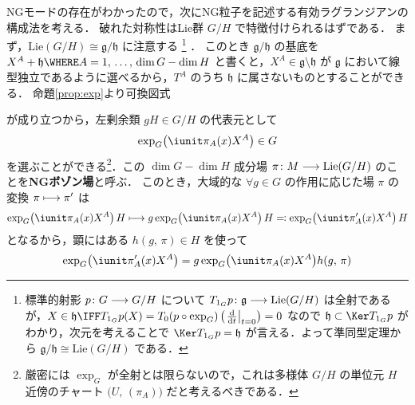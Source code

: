 \documentclass[TQFT_main]{subfiles}
\begin{document}
NGモードの存在がわかったので，次にNG粒子を記述する有効ラグランジアンの構成法を考える．
破れた対称性はLie群 $G/H$ で特徴付けられるはずである．
まず，$\mathrm{Lie}(G/H) \cong \mathfrak{g}/\mathfrak{h}$ に注意する
\footnote{標準的射影 $p \colon G \longrightarrow G/H$ について $T_{1_G} p \colon \mathfrak{g} \longrightarrow \mathrm{Lie}(G/H)$  は全射であるが，$X \in \mathfrak{h} \IFF T_{1_G}p (X) = T_{0}(p \circ \exp_G) \left( \eval{\dv{}{t}}_{t=0} \right)=0$ なので $\mathfrak{h} \subset \Ker T_{1_G} p$ がわかり，次元を考えることで $\Ker T_{1_G} p = \mathfrak{h}$ が言える．よって準同型定理から $\mathfrak{g}/\mathfrak{h} \cong \mathrm{Lie}(G/H)$ である．}
．
このとき $\mathfrak{g}/\mathfrak{h}$ の基底を $X^A + \mathfrak{h}\WHERE A=1,\, \dots,\, \dim G - \dim H$ と書くと，$X^A \in \mathfrak{g} \setminus \mathfrak{h}$ が $\mathfrak{g}$ において線型独立であるように選べるから，$T^A$ のうち $\mathfrak{h}$ に属さないものとすることができる．
命題\ref{prop:exp}より可換図式
\begin{center}
\end{center}
が成り立つから，左剰余類 $gH \in G/H$ の代表元として
\begin{align}
    \label{eq:coordinate-coset1}
    \exp_G\bigl(\iunit \pi_A(x)X^A\bigr) \in G
\end{align}
を選ぶことができる\footnote{厳密には $\exp_G$ が全射とは限らないので，これは多様体 $G/H$ の単位元 $H$ 近傍のチャート $\bigl(U,\, (\pi_A)\bigr)$ だと考えるべきである．}．この $\dim G - \dim H$ 成分場 $\pi \colon M \longrightarrow \mathrm{Lie} (G/H)$ のことを\textbf{NGボゾン場}と呼ぶ．
このとき，大域的な $\forall g \in G$ の作用に応じた場 $\pi$ の変換 $\pi \longmapsto \pi'$ は
\begin{align}
    \exp_G\bigl(\iunit \pi_A(x)X^A\bigr)\, H \lmto g \exp_G\bigl(\iunit \pi_A(x)X^A\bigr)\, H \eqqcolon \exp_G \bigl( \iunit \pi'_A(x) X^A \bigr)\, H
\end{align}
となるから，顕にはある $h(g,\, \pi) \in H$ を使って
\begin{align}
    \label{eq:NGB-transform}
    \exp_G \bigl( \iunit \pi'_A(x) X^A \bigr) = g \exp_G\bigl(\iunit \pi_A(x)X^A\bigr) h(g,\, \pi)
\end{align}
\end{document}
